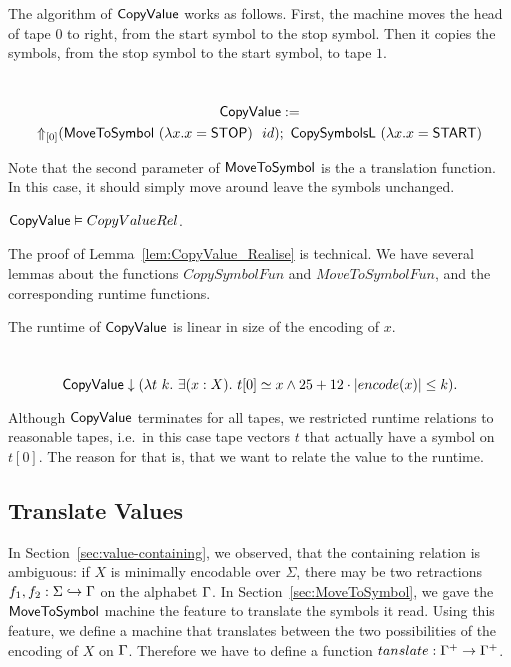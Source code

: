 The algorithm of $\MS{CopyValue}$ works as follows.  First, the machine moves the head of tape $0$ to right, from the start symbol to the stop symbol.
Then it copies the symbols, from the stop symbol to the start symbol, to tape $1$.

\begin{definition}[$\MS{CopyValue}$]
  \label{def:CopyValue}
  ~
  \begin{multline*}
    \MS{CopyValue} := \\
    \LiftTapes{(\MS{MoveToSymbol}~(\lambda x. x=\MS{STOP})~~id)}{\Vector{0}}
    \Seq
    \MS{CopySymbolsL}~(\lambda x. x=\MS{START})
  \end{multline*}
\end{definition}

Note that the second parameter of $\MS{MoveToSymbol}$ is the a translation function.  In this case, it should simply move around leave the symbols
unchanged.

\begin{lemma}
  \label{lem:CopyValue_Realise}
  $\MS{CopyValue} \Realise CopyValueRel$.
\end{lemma}

The proof of Lemma~\ref{lem:CopyValue_Realise} is technical.  We have several lemmas about the functions $CopySymbolFun$ and $MoveToSymbolFun$, and
the corresponding runtime functions.

The runtime of $\MS{CopyValue}$ is linear in size of the encoding of $x$.
\begin{lemma}
  \label{lem:CopyValue_TerminatesIn}
  ~
  \[
    \MS{CopyValue} \TerminatesIn (\lambda t~k.~\exists(x:X).~t[0] \simeq x \land 25 + 12 \cdot \size{x} \leq k).
  \]
\end{lemma}

Although $\MS{CopyValue}$ terminates for all tapes, we restricted runtime relations to reasonable tapes, i.e.\ in this case tape vectors $t$ that
actually have a symbol on $t[0]$.  The reason for that is, that we want to relate the value to the runtime.

\subsection{Translate Values}
\label{sec:translate-value}

In Section~\ref{sec:value-containing}, we observed, that the containing relation is ambiguous: if $X$ is minimally encodable over $\Sigma$, there may
be two retractions $f_1, f_2 : \Sigma \hookrightarrow \Tau$ on the alphabet $\Tau$.  In Section~\ref{sec:MoveToSymbol}, we gave the
$\MS{MoveToSymbol}$ machine the feature to translate the symbols it read.  Using this feature, we define a machine that translates between the two
possibilities of the encoding of $X$ on $\Tau$.  Therefore we have to define a function $tanslate : \Tau^+ \to \Tau^+$.

